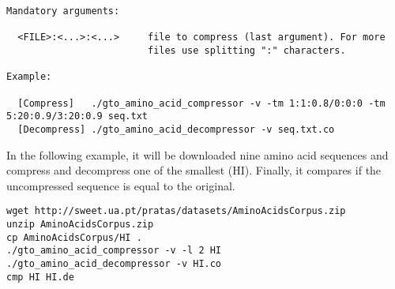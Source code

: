 \begin{lstlisting}
Mandatory arguments:                                                   
                                                                       
  <FILE>:<...>:<...>     file to compress (last argument). For more    
                         files use splitting ":" characters.         
                                                                       
Example:                                                               
                                                                       
  [Compress]   ./gto_amino_acid_compressor -v -tm 1:1:0.8/0:0:0 -tm 5:20:0.9/3:20:0.9 seq.txt 
  [Decompress] ./gto_amino_acid_decompressor -v seq.txt.co  
\end{lstlisting}
In the following example, it will be downloaded nine amino acid sequences and compress and decompress one of the smallest (HI). Finally, it compares if the uncompressed sequence is equal to the original.
\begin{lstlisting}
wget http://sweet.ua.pt/pratas/datasets/AminoAcidsCorpus.zip
unzip AminoAcidsCorpus.zip
cp AminoAcidsCorpus/HI .
./gto_amino_acid_compressor -v -l 2 HI
./gto_amino_acid_decompressor -v HI.co
cmp HI HI.de
\end{lstlisting}